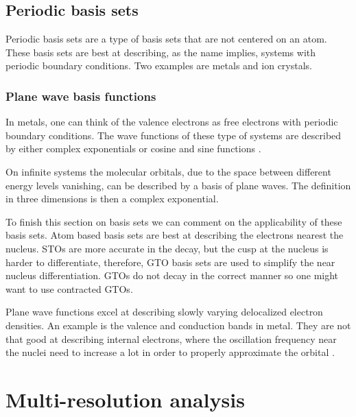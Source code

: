 \documentclass[../master_thesis.tex]{subfiles}
\begin{document}
\subsection{Periodic basis sets}
Periodic basis sets are a type of basis sets that are not centered on an atom.
These basis sets are best at describing, as the name implies, systems with periodic
boundary conditions. Two examples are metals and ion crystals.

\subsubsection{Plane wave basis functions}
In metals, one can think of the valence electrons as free electrons with
periodic boundary conditions. The wave functions of these type of systems are
described by either complex exponentials or cosine and sine functions \cite{Jensen:2017}.

On infinite systems the molecular orbitals, due to the space between different energy levels
vanishing, can be described by a basis of plane waves. The definition in three dimensions
is then a complex exponential.

To finish this section on basis sets we can comment on the applicability of these
basis sets. Atom based basis sets are best at describing the electrons nearest the
nucleus. \acp{STO} are more accurate in the decay, but the cusp at the nucleus is
harder to differentiate, therefore, \ac{GTO} basis sets are used to simplify the
near nucleus differentiation. \acp{GTO} do not decay in the correct manner so one
might want to use contracted \acp{GTO}.

Plane wave functions excel at describing slowly varying delocalized electron densities.
An example is the valence and conduction bands in metal. They are not that good at
describing internal electrons, where the oscillation frequency near the nuclei need to increase a lot
in order to properly approximate the orbital \cite{Jensen:2017}.

\section{Multi-resolution analysis}
\end{document}
